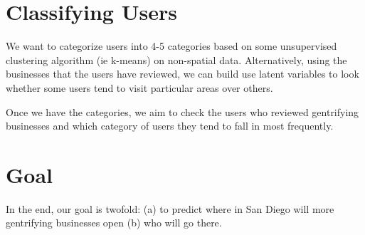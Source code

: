 \documentclass[11pt,a4paper]{article}
\begin{document}
	
	\section{Classifying Users}
	We want to categorize users into 4-5 categories based on some unsupervised clustering algorithm (ie k-means) on non-spatial data. Alternatively, using the businesses that the users have reviewed, we can build use latent variables to look whether some users tend to visit particular areas over others. 
	
	
	Once we have the categories, we aim to check the users who reviewed gentrifying businesses and which category of users they tend to fall in most frequently. 
	
	\section{Goal}
	In the end, our goal is twofold: (a) to predict where in San Diego will more gentrifying businesses open (b) who will go there.
	
\end{document}
